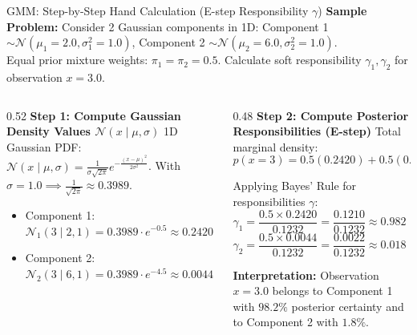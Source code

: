 \documentclass[aspectratio=169,10pt]{beamer}
\begin{document}
\begin{frame}{GMM: Step-by-Step Hand Calculation (E-step Responsibility $\gamma$)}
  \scriptsize
  \textbf{Sample Problem:} Consider 2 Gaussian components in 1D: Component 1 $\sim \mathcal{N}(\mu_1=2.0, \sigma_1^2=1.0)$, Component 2 $\sim \mathcal{N}(\mu_2=6.0, \sigma_2^2=1.0)$.\\
  Equal prior mixture weights: $\pi_1 = \pi_2 = 0.5$. Calculate soft responsibility $\gamma_1, \gamma_2$ for observation $x = 3.0$.
  
  \vspace{0.4em}
  \begin{columns}[T]
    \begin{column}{0.52\textwidth}
      \textbf{Step 1: Compute Gaussian Density Values $\mathcal{N}(x \mid \mu, \sigma)$}
      1D Gaussian PDF: $\mathcal{N}(x \mid \mu, \sigma) = \frac{1}{\sigma \sqrt{2\pi}} e^{-\frac{(x - \mu)^2}{2\sigma^2}}$.
      With $\sigma=1.0 \implies \frac{1}{\sqrt{2\pi}} \approx 0.3989$.
      \begin{itemize}\setlength{\itemsep}{2pt}
        \item Component 1: $\mathcal{N}_1(3 \mid 2, 1) = 0.3989 \cdot e^{-0.5} \approx \mathbf{0.2420}$
        \item Component 2: $\mathcal{N}_2(3 \mid 6, 1) = 0.3989 \cdot e^{-4.5} \approx \mathbf{0.0044}$
      \end{itemize}
    \end{column}
    \begin{column}{0.48\textwidth}
      \textbf{Step 2: Compute Posterior Responsibilities (E-step)}
      Total marginal density:
      $$p(x=3) = 0.5(0.2420) + 0.5(0.0044) = \mathbf{0.1232}$$
      
      Applying Bayes' Rule for responsibilities $\gamma$:
      $$\gamma_1 = \frac{0.5 \times 0.2420}{0.1232} = \frac{0.1210}{0.1232} \approx \mathbf{0.982\ (98.2\%)}$$
      $$\gamma_2 = \frac{0.5 \times 0.0044}{0.1232} = \frac{0.0022}{0.1232} \approx \mathbf{0.018\ (1.8\%)}$$
      
      \textbf{Interpretation:} Observation $x=3.0$ belongs to Component 1 with $98.2\%$ posterior certainty and to Component 2 with $1.8\%$.
    \end{column}
  \end{columns}
\end{frame}
\end{document}
